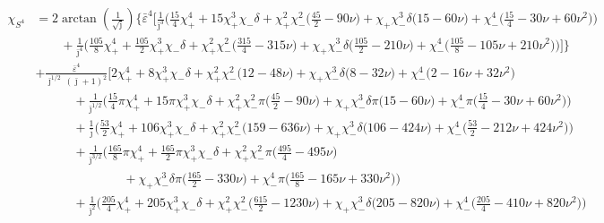 \documentclass[prd,superscriptaddress,preprintnumbers,tightenlines,nofootinbib, eqsecnum]{revtex4-2}
\newcommand{\nn}{\nonumber}
\begin{document}
\begin{align}
\chi_{S^4} &= 2\arctan\!\left(\frac{1}{\sqrt{\bar{\jmath}}}\right)\Bigg\{\bar{\varepsilon}^{4}\Bigg[
\frac{1}{\bar{\jmath}^{3}}\Bigg(\frac{15}{4}\chi_{+}^{4} + 15\chi_{+}^{3}\chi_{-}\delta + \chi_{+}^{2}\chi_{-}^{2}\bigg(\frac{45}{2} - 90 \nu\bigg) + \chi_{+}\chi_{-}^{3}\delta\bigg(15 - 60 \nu\bigg) + \chi_{-}^{4}\bigg(\frac{15}{4} - 30 \nu + 60 \nu^{2}\bigg)\Bigg) \nn \\
&\qquad + \frac{1}{\bar{\jmath}^{4}}\Bigg(\frac{105}{8}\chi_{+}^{4} + \frac{105}{2}\chi_{+}^{3}\chi_{-}\delta + \chi_{+}^{2}\chi_{-}^{2}\bigg(\frac{315}{4} - 315 \nu\bigg) + \chi_{+}\chi_{-}^{3}\delta\bigg(\frac{105}{2} - 210 \nu\bigg) + \chi_{-}^{4}\bigg(\frac{105}{8} - 105 \nu + 210 \nu^{2}\bigg)\Bigg)\Bigg]\Bigg\} \nn \\
&+ \frac{\bar{\varepsilon}^{4}}{\bar{\jmath}^{1/2}\,(\bar{\jmath}+1)^{2}}\Bigg[
2\chi_{+}^{4} + 8\chi_{+}^{3}\chi_{-}\delta + \chi_{+}^{2}\chi_{-}^{2}\bigg(12 - 48 \nu\bigg) + \chi_{+}\chi_{-}^{3}\delta\bigg(8 - 32 \nu\bigg) + \chi_{-}^{4}\bigg(2 - 16 \nu + 32 \nu^{2}\bigg) \nn \\
&\qquad\quad + \frac{1}{\bar{\jmath}^{1/2}}\Bigg(\frac{15}{4}\pi\chi_{+}^{4} + 15 \pi\chi_{+}^{3}\chi_{-}\delta + \chi_{+}^{2}\chi_{-}^{2}\pi\bigg(\frac{45}{2} - 90 \nu\bigg) + \chi_{+}\chi_{-}^{3}\delta\pi\bigg(15 - 60 \nu\bigg) + \chi_{-}^{4}\pi\bigg(\frac{15}{4} - 30 \nu + 60 \nu^{2}\bigg)\Bigg) \nn \\
&\qquad\quad + \frac{1}{\bar{\jmath}}\Bigg(\frac{53}{2}\chi_{+}^{4} + 106\chi_{+}^{3}\chi_{-}\delta + \chi_{+}^{2}\chi_{-}^{2}\bigg(159 - 636 \nu\bigg) + \chi_{+}\chi_{-}^{3}\delta\bigg(106 - 424 \nu\bigg) + \chi_{-}^{4}\bigg(\frac{53}{2} - 212 \nu + 424 \nu^{2}\bigg)\Bigg) \nn \\
&\qquad\quad + \frac{1}{\bar{\jmath}^{3/2}}\Bigg(\frac{165}{8}\pi\chi_{+}^{4} + \frac{165}{2}\pi\chi_{+}^{3}\chi_{-}\delta + \chi_{+}^{2}\chi_{-}^{2}\pi\bigg(\frac{495}{4} - 495 \nu\bigg) \nn \\
&\qquad\qquad\qquad\quad + \chi_{+}\chi_{-}^{3}\delta\pi\bigg(\frac{165}{2} - 330 \nu\bigg)  + \chi_{-}^{4}\pi\bigg(\frac{165}{8} - 165 \nu + 330 \nu^{2}\bigg)\Bigg) \nn \\
&\qquad\quad + \frac{1}{\bar{\jmath}^{2}}\Bigg(\frac{205}{4}\chi_{+}^{4} + 205\chi_{+}^{3}\chi_{-}\delta + \chi_{+}^{2}\chi_{-}^{2}\bigg(\frac{615}{2} - 1230 \nu\bigg) + \chi_{+}\chi_{-}^{3}\delta\bigg(205 - 820 \nu\bigg) + \chi_{-}^{4}\bigg(\frac{205}{4} - 410 \nu + 820 \nu^{2}\bigg)\Bigg) \nn \\

\end{align}
\end{document}

